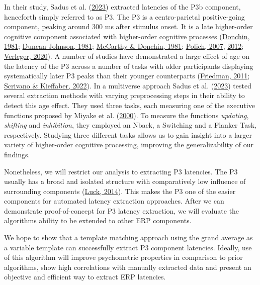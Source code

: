 \documentclass[
  man]{apa7}
\begin{document}
In their study, Sadus et al. (\protect\hyperlink{ref-sadus2023multiverse}{2023}) extracted latencies of the P3b component, henceforth simply referred to as P3. The P3 is a centro-parietal positive-going component, peaking around 300 ms after stimulus onset. It is a late higher-order cognitive component associated with higher-order cognitive processes (\protect\hyperlink{ref-donchin1981surprise}{Donchin, 1981}; \protect\hyperlink{ref-duncan1981young}{Duncan-Johnson, 1981}; \protect\hyperlink{ref-mccarthy1981metric}{McCarthy \& Donchin, 1981}; \protect\hyperlink{ref-polich2007updating}{Polich, 2007}, \protect\hyperlink{ref-polich2012neuropsychology}{2012}; \protect\hyperlink{ref-verleger2020effects}{Verleger, 2020}). A number of studies have demonstrated a large effect of age on the latency of the P3 across a number of tasks with older participants displaying systematically later P3 peaks than their younger counterparts (\protect\hyperlink{ref-friedman2012components}{Friedman, 2011}; \protect\hyperlink{ref-scrivano2022behavioral}{Scrivano \& Kieffaber, 2022}). In a multiverse approach Sadus et al. (\protect\hyperlink{ref-sadus2023multiverse}{2023}) tested several extraction methods with varying preprocessing steps in their ability to detect this age effect. They used three tasks, each measuring one of the executive functions proposed by Miyake et al. (\protect\hyperlink{ref-miyake2000unity}{2000}). To measure the functions \emph{updating}, \emph{shifting} and \emph{inhibition}, they employed an Nback, a Switching and a Flanker Task, respectively. Studying three different tasks allows us to gain insight into a larger variety of higher-order cognitive processing, improving the generalizability of our findings.

Nonetheless, we will restrict our analysis to extracting P3 latencies. The P3 usually has a broad and isolated structure with comparatively low influence of surrounding components (\protect\hyperlink{ref-luck2014introduction}{Luck, 2014}). This makes the P3 one of the easier components for automated latency extraction approaches. After we can demonstrate proof-of-concept for P3 latency extraction, we will evaluate the algorithms ability to be extended to other ERP components.

We hope to show that a template matching approach using the grand average as a variable template can successfully extract P3 component latencies. Ideally, use of this algorithm will improve psychometric properties in comparison to prior algorithms, show high correlations with manually extracted data and present an objective and efficient way to extract ERP latencies.
\end{document}
